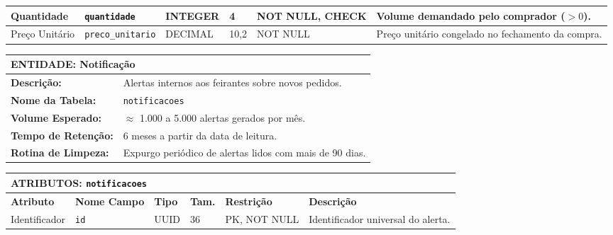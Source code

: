 \documentclass[12pt,a4paper]{article}
\begin{document}
\begin{spacing}{1.0}
\begin{tabularx}{\textwidth}{|p{1.6cm}|p{1.9cm}|p{1.2cm}|p{0.7cm}|p{1.9cm}|X|}
Quantidade & \texttt{quantidade} & INTEGER & 4 & NOT NULL, CHECK & Volume demandado pelo comprador ($> 0$). \\ \hline

Preço Unitário & \texttt{preco\_unitario} & DECIMAL & 10,2 & NOT NULL & Preço unitário congelado no fechamento da compra. \\ \hline

\end{tabularx}

\vspace{0.6cm}

\noindent

\begin{tabularx}{\textwidth}{|p{3.0cm}|X|}

\hline

\multicolumn{2}{|l|}{\textbf{ENTIDADE: Notificação}} \\ \hline

\textbf{Descrição:} & Alertas internos aos feirantes sobre novos pedidos. \\ \hline

\textbf{Nome da Tabela:} & \texttt{notificacoes} \\ \hline

\textbf{Volume Esperado:} & $\approx$ 1.000 a 5.000 alertas gerados por mês. \\ \hline

\textbf{Tempo de Retenção:} & 6 meses a partir da data de leitura. \\ \hline

\textbf{Rotina de Limpeza:} & Expurgo periódico de alertas lidos com mais de 90 dias. \\ \hline

\end{tabularx}

\vspace{0.25cm}

\noindent

\begin{tabularx}{\textwidth}{|p{1.6cm}|p{1.9cm}|p{1.2cm}|p{0.7cm}|p{1.9cm}|X|}

\hline

\multicolumn{6}{|l|}{\textbf{ATRIBUTOS: \texttt{notificacoes}}} \\ \hline

\textbf{Atributo} & \textbf{Nome Campo} & \textbf{Tipo} & \textbf{Tam.} & \textbf{Restrição} & \textbf{Descrição} \\ \hline

Identificador & \texttt{id} & UUID & 36 & PK, NOT NULL & Identificador universal do alerta. \\ \hline


\end{tabularx}
\end{spacing}
\end{document}

